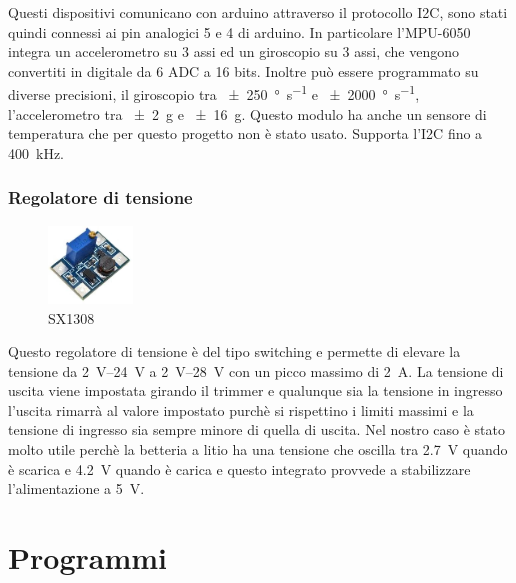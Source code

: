 \documentclass[10pt,a4paper]{article}
\begin{document}
Questi dispositivi comunicano con arduino attraverso il protocollo I2C, sono stati quindi connessi ai pin analogici 5 e 4 di arduino.
In particolare l'MPU-6050 integra un accelerometro su 3 assi ed un giroscopio su 3 assi, che vengono convertiti in digitale da 6 ADC a 16 bits. Inoltre pu\`o essere programmato su diverse precisioni, il giroscopio tra \SI[per-mode = symbol]{+-250}{\degree\per\second} e \SI[per-mode = symbol]{+-2000}{\degree\per\second}, l'accelerometro tra \SI[per-mode = symbol]{+-2}{g} e \SI[per-mode = symbol]{+-16}{g}. Questo modulo ha anche un sensore di temperatura che per questo progetto non \`e  stato usato. Supporta l'I2C fino a \SI{400}{\kilo \hertz}.
\clearpage
\subsubsection{Regolatore di tensione}
\begin{figure}
	\centering
	\vspace{-30pt}
	\includegraphics[width=0.2\textwidth]{DC-DC_sx1308.jpg}
	\vspace{-20pt}
	\caption{SX1308}
	\label{fig:sx1308}
\end{figure}
Questo regolatore di tensione \`e del tipo switching e permette di elevare la tensione da \SIrange{2}{24}{\volt} a \SIrange{2}{28}{\volt} con un picco massimo di \SI{2}{\ampere}. La tensione di uscita viene impostata girando il trimmer e qualunque sia la tensione in ingresso l'uscita rimarr\`a al valore impostato purch\`e si rispettino i limiti massimi e la tensione di ingresso sia sempre minore di quella di uscita. Nel nostro caso \`e stato molto utile perch\`e la betteria a litio ha una tensione che oscilla tra \SI{2.7}{\volt} quando \`e scarica e \SI{4.2}{\volt} quando \`e carica e questo integrato provvede a stabilizzare l'alimentazione a \SI{5}{\volt}.

\clearpage
\section{Programmi}
\end{document}
